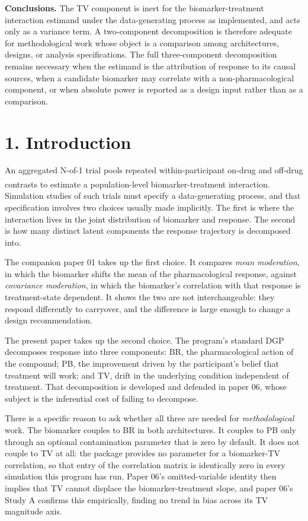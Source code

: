 \documentclass[
  11pt,
]{article}
\begin{document}
\textbf{Conclusions.} The TV component is inert for the
biomarker-treatment interaction estimand under the data-generating
process as implemented, and acts only as a variance term. A
two-component decomposition is therefore adequate for methodological
work whose object is a comparison among architectures, designs, or
analysis specifications. The full three-component decomposition
remains necessary when the estimand is the attribution of response to
its causal sources, when a candidate biomarker may correlate with a
non-pharmacological component, or when absolute power is reported as
a design input rather than as a comparison.

\section{1. Introduction}

An aggregated N-of-1 trial pools repeated within-participant on-drug
and off-drug contrasts to estimate a population-level
biomarker-treatment interaction\textsuperscript{}. Simulation
studies of such trials must specify a data-generating process, and
that specification involves two choices usually made implicitly. The
first is where the interaction lives in the joint distribution of
biomarker and response. The second is how many distinct latent
components the response trajectory is decomposed into.

The companion paper 01 takes up the first choice. It compares
\emph{mean moderation}, in which the biomarker shifts the mean of the
pharmacological response, against \emph{covariance moderation}, in
which the biomarker's correlation with that response is
treatment-state dependent. It shows the two are not interchangeable:
they respond differently to carryover, and the difference is large
enough to change a design recommendation.

The present paper takes up the second choice. The program's standard
DGP decomposes response into three components: BR, the
pharmacological action of the compound; PB, the improvement driven by
the participant's belief that treatment will work; and TV, drift in
the underlying condition independent of treatment. That decomposition
is developed and defended in paper 06, whose subject is the
inferential cost of failing to decompose.

There is a specific reason to ask whether all three are needed for
\emph{methodological} work. The biomarker couples to BR in both
architectures. It couples to PB only through an optional
contamination parameter that is zero by default. It does not couple
to TV at all: the package provides no parameter for a biomarker-TV
correlation, so that entry of the correlation matrix is identically
zero in every simulation this program has run. Paper 06's
omitted-variable identity then implies that TV cannot displace the
biomarker-treatment slope, and paper 06's Study A confirms this
empirically, finding no trend in bias across its TV magnitude axis.
\end{document}
